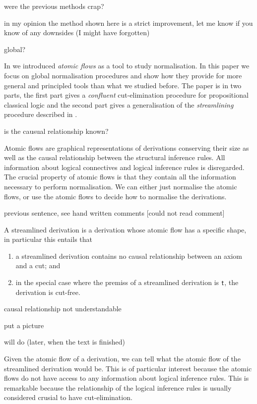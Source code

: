 \documentclass[a4paper]{amsart}
\theoremstyle{remark}
\theoremstyle{definition}
\newcommand{\Ale}[1]{{\color{NavyBlue}\noindent {\bf A:} #1}}
\newcommand{\Tom}[1]{{\color{PineGreen}\noindent {\bf T:} #1}}
\begin{document}
\Ale{were the previous methods crap?}

\Tom{in my opinion the method shown here is a strict improvement, let me know if you know of any downsides (I might have forgotten)}

\Ale{global?}

In \cite{GuglGund:07:Normalis:lr} we introduced \emph{atomic flows} as a tool to study normalisation. In this paper we focus on global normalisation procedures and show how they provide for more general and principled tools than what we studied before. The paper is in two parts, the first part gives a \emph{confluent} cut-elimination procedure for propositional classical logic and the second part gives a generalisation of the \emph{streamlining} procedure described in \cite{GuglGund:07:Normalis:lr}.

\Ale{is the causual relationship known?}

Atomic flows are graphical representations of derivations conserving their size as well as the causal relationship between the structural inference rules. All information about logical connectives and logical inference rules is disregarded. The crucial property of atomic flows is that they contain all the information necessary to perform normalisation. We can either just normalise the atomic flows, or use the atomic flows to decide how to normalise the derivations.

\Ale{previous sentence, see hand written comments [could not read comment]}

A streamlined derivation is a derivation whose atomic flow has a speciﬁc shape, in particular this entails that

\begin{enumerate}
\item a streamlined derivation contains no causal relationship between an axiom and a cut; and
\item in the special case where the premiss of a streamlined derivation is $\mathsf t$, the derivation is cut-free.
\end{enumerate}

\Ale{causal relationship not understandable}

\Ale{put a picture}

\Tom{will do (later, when the text is finished)}

Given the atomic flow of a derivation, we can tell what the atomic flow of the streamlined derivation would be. This is of particular interest because the atomic flows do not have access to any information about logical inference rules. This is remarkable because the relationship of the logical inference rules is usually considered crusial to have cut-elimination.
\end{document}

